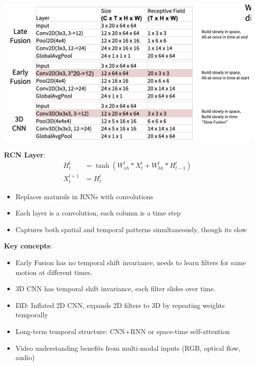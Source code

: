 \documentclass{article}
\begin{document}
\begin{multicols}{3}
\includegraphics[width=\columnwidth]{imgs/video.png}

\textbf{RCN Layer}:
\begin{align*}
H_t^l &= \tanh(W_{xh}^l * X_t^l + W_{hh}^l * H_{t-1}^l)\\
X_t^{l+1} &= H_t^l
\end{align*}
\begin{itemize}
\item Replaces matmuls in RNNs with convolutions
\item Each layer is a convolution, each column is a time step
\item Captures both spatial and temporal patterns simultaneously, though its slow
\end{itemize}

\textbf{Key concepts}:
\begin{itemize}
\item Early Fusion has no temporal shift invariance, needs to learn filters for same motion at different times.
\item 3D CNN has temporal shift invariance, each filter slides over time.
\item I3D: Inflated 2D CNN, expands 2D filters to 3D by repeating weights temporally
\item Long-term temporal structure: CNN+RNN or space-time self-attention
\item Video understanding benefits from multi-modal inputs (RGB, optical flow, audio)
\end{itemize}

\end{multicols}
\end{document}
